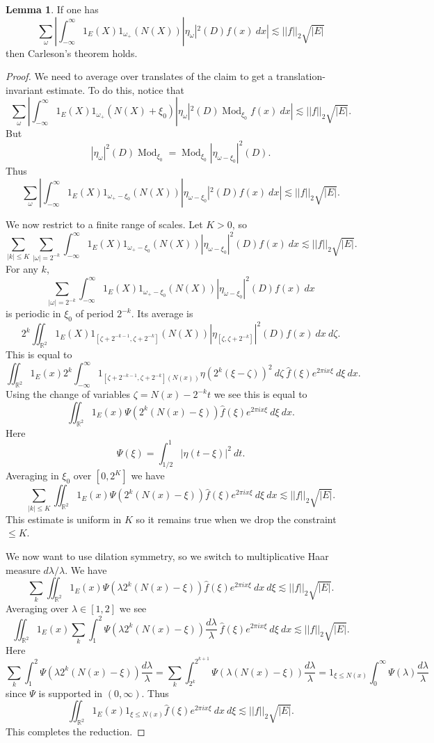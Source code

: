\documentclass[12pt]{report}
\newcommand{\RR}{\mathbb{R}}
\DeclareMathOperator*{\Mod}{Mod}
\theoremstyle{definition}
\newtheorem{lemma}[theorem]{Lemma}
\begin{document}
\begin{lemma}
If one has
$$\sum_\omega |\int_{-\infty}^\infty 1_E(X)1_{\omega_+}(N(X))|\eta_\omega|^2(D)f(x) ~dx| \lesssim ||f||_2 \sqrt{|E|}$$
then Carleson's theorem holds.
\end{lemma}
\begin{proof}
We need to average over translates of the claim to get a translation-invariant estimate. To do this, notice that
$$\sum_\omega |\int_{-\infty}^\infty 1_E(X)1_{\omega_+}(N(X) + \xi_0)|\eta_\omega|^2(D)\Mod_{\xi_0}f(x)~dx| \lesssim ||f||_2\sqrt{|E|}.$$
But
$$|\eta_\omega|^2(D) \Mod_{\xi_0} = \Mod_{\xi_0}|\eta_{\omega - \xi_0}|^2(D).$$
Thus
$$\sum_\omega |\int_{-\infty}^\infty 1_E(X)1_{\omega_+ - \xi_0}(N(X))|\eta_{\omega - \xi_0}|^2(D)f(x)~dx| \lesssim ||f||_2\sqrt{|E|}.$$

We now restrict to a finite range of scales. Let $K > 0$, so
$$\sum_{|k| \leq K} \sum_{|\omega| = 2^{-k}} \int_{-\infty}^\infty 1_E(X)1_{\omega_+-\xi_0}(N(X))|\eta_{\omega - \xi_0}|^2(D)f(x)~dx \lesssim ||f||_2\sqrt{|E|}.$$
For any $k$,
$$\sum_{|\omega| = 2^{-k}} \int_{-\infty}^\infty 1_E(X)1_{\omega_+-\xi_0}(N(X))|\eta_{\omega - \xi_0}|^2(D)f(x)~dx$$
is periodic in $\xi_0$ of period $2^{-k}$. Its average is
$$2^k \iint_{\RR^2} 1_E(X) 1_{[\zeta + 2^{-k-1}, \zeta + 2^{-k}]}(N(X))|\eta_{[\zeta,\zeta+2^{-k}]}|^2(D)f(x)~dx~d\zeta.$$
This is equal to
$$\iint_{\RR^2} 1_E(x)2^k \int_{-\infty}^\infty 1_{[\zeta+2^{-k-1},\zeta+2^{-k}](N(x))}\eta(2^k(\xi-\zeta))^2~d\zeta ~\hat f(\xi)e^{2\pi ix\xi}~d\xi~dx.$$
Using the change of variables $\zeta = N(x)-2^{-k}t$ we see this is equal to
$$\iint_{\RR^2} 1_E(x)\Psi(2^k(N(x)-\xi))\hat f(\xi)e^{2\pi ix\xi}~d\xi~dx.$$
Here
$$\Psi(\xi) = \int_{1/2}^1 |\eta(t - \xi)|^2~dt.$$
Averaging in $\xi_0$ over $[0, 2^K]$ we have
$$\sum_{|k| \leq K} \iint_{\RR^2} 1_E(x)\Psi(2^k(N(x)-\xi))\hat f(\xi)e^{2\pi ix\xi}~d\xi~dx \lesssim ||f||_2\sqrt{|E|}.$$
This estimate is uniform in $K$ so it remains true when we drop the constraint $\leq K$.

We now want to use dilation symmetry, so we switch to multiplicative Haar measure $d\lambda/\lambda$. We have
$$\sum_k \iint_{\RR^2} 1_E(x)\Psi(\lambda 2^k(N(x)-\xi)) \hat f(\xi)e^{2\pi ix\xi}~dx~d\xi \lesssim ||f||_2\sqrt{|E|}.$$
Averaging over $\lambda \in [1,2]$ we see
$$\iint_{\RR^2} 1_E(x) \sum_k \int_1^2 \Psi(\lambda 2^k(N(x)-\xi)) \frac{d\lambda}{\lambda}~\hat f(\xi)e^{2\pi ix\xi}~d\xi~dx \lesssim ||f||_2\sqrt{|E|}.$$
Here
$$\sum_k \int_1^2 \Psi(\lambda 2^k(N(x)-\xi))\frac{d\lambda}{\lambda}
= \sum_k \int_{2^k}^{2^{k+1}}\Psi(\lambda(N(x)-\xi))\frac{d\lambda}{\lambda} = 1_{\xi\leq N(x)}\int_0^\infty \Psi(\lambda) \frac{d\lambda}{\lambda}$$
since $\Psi$ is supported in $(0, \infty)$.
Thus
$$\iint_{\RR^2}1_E(x)1_{\xi \leq N(x)} \hat f(\xi)e^{2\pi ix\xi}~dx ~d\xi \lesssim ||f||_2 \sqrt{|E|}.$$
This completes the reduction.
\end{proof}
\end{document}
